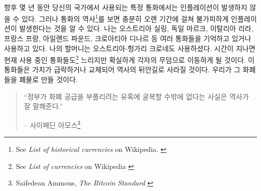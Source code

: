 \paragraph{}
향후 몇 년 동안 당신의 국가에서 사용되는 특정 통화에서는 인플레이션이 발생하지 않을 수 있다. 
그러나 통화의 역사\footnote{See \textit{List of historical currencies} on Wikipedia.
	\cite{wiki:historical-currencies}}를
보면 충분히 오랜 기간에 걸쳐 불가피하게 인플레이션이 발생한다는 것을 알 수 있다.
나는 오스트리아 실링, 독일 마르크, 이탈리아 리라, 프랑스 프랑, 아일랜드 파운드, 크로아티아 디나르 등 여러
통화들을 기억하고 있거나 사용하고 있다. 
나의 할머니는 오스트리아-헝가리 크로네도 사용하셨다. 
시간이 지나면 현재 사용 중인 통화들도\footnote{See
	\textit{List of currencies} on Wikipedia \cite{wiki:list-of-currencies}}
느리지만 확실하게 각자의 무덤으로 이동하게 될 것이다.
이 통화들은 가치가 급락하거나 교체되어 역사의 뒤안길로 사라질 것이다.
우리가 그 화폐들을 폐물로 만들 것이다.

\begin{quotation}\begin{samepage}
		\enquote{정부가 화폐 공급을 부풀리려는 유혹에 굴복할 수밖에 없다는 사실은 역사가 잘 말해준다.}
		\begin{flushright} -- 사이페딘 아모스\footnote{Saifedean Ammous, \textit{The Bitcoin
					Standard} \cite{bitcoin-standard}}
\end{flushright}\end{samepage}\end{quotation}

